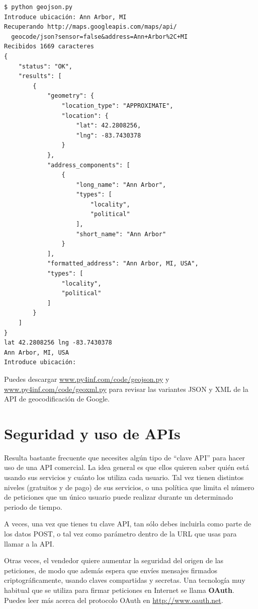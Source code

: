 \beforeverb
\begin{verbatim}
$ python geojson.py
Introduce ubicación: Ann Arbor, MI
Recuperando http://maps.googleapis.com/maps/api/
  geocode/json?sensor=false&address=Ann+Arbor%2C+MI
Recibidos 1669 caracteres
{
    "status": "OK", 
    "results": [
        {
            "geometry": {
                "location_type": "APPROXIMATE", 
                "location": {
                    "lat": 42.2808256, 
                    "lng": -83.7430378
                }
            }, 
            "address_components": [
                {
                    "long_name": "Ann Arbor", 
                    "types": [
                        "locality", 
                        "political"
                    ], 
                    "short_name": "Ann Arbor"
                } 
            ], 
            "formatted_address": "Ann Arbor, MI, USA", 
            "types": [
                "locality", 
                "political"
            ]
        }
    ]
}
lat 42.2808256 lng -83.7430378
Ann Arbor, MI, USA
Introduce ubicación:
\end{verbatim}
\afterverb
%
Puedes descargar
\url{www.py4inf.com/code/geojson.py} y
\url{www.py4inf.com/code/geoxml.py} para revisar
las variantes JSON y XML de la API de geocodificación de Google.

\section{Seguridad y uso de APIs}

Resulta bastante frecuente que necesites algún tipo de
``clave API'' para hacer uso de una API comercial. La
idea general es que ellos quieren saber quién está usando
sus servicios y cuánto los utiliza cada usuario.
Tal vez tienen distintos niveles (gratuitos y de pago) de sus servicios,
o una política que limita el número de peticiones
que un único usuario puede realizar durante un determinado
periodo de tiempo.

A veces, una vez que tienes tu clave API, tan sólo debes incluirla
como parte de los datos POST, o tal vez como parámetro
dentro de la URL que usas para llamar a la API.

Otras veces, el vendedor quiere aumentar la seguridad del
origen de las peticiones, de modo que además espera que
envíes mensajes firmados criptográficamente, usando claves
compartidas y secretas. Una tecnología muy habitual que se utiliza
para firmar peticiones en Internet se llama {\bf OAuth}.
Puedes leer más acerca del protocolo OAuth en 
\url{http://www.oauth.net}.

